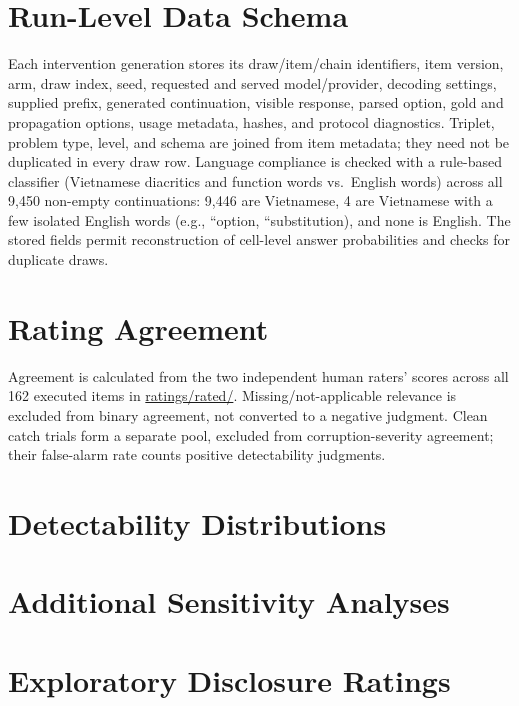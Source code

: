 \section{Run-Level Data Schema}
\label{app:schema}

Each intervention generation stores its draw/item/chain identifiers, item version, arm, draw index, seed, requested and served model/provider, decoding settings, supplied prefix, generated continuation, visible response, parsed option, gold and propagation options, usage metadata, hashes, and protocol diagnostics. Triplet, problem type, level, and schema are joined from item metadata; they need not be duplicated in every draw row. Language compliance is checked with a rule-based classifier (Vietnamese diacritics and function words vs.\ English words) across all 9,450 non-empty continuations: 9,446 are Vietnamese, 4 are Vietnamese with a few isolated English words (e.g., ``option, ``substitution), and none is English. The stored fields permit reconstruction of cell-level answer probabilities and checks for duplicate draws.

\section{Rating Agreement}
\label{app:consolidation}

Agreement is calculated from the two independent human raters' scores across all 162 executed items in \url{ratings/rated/}. Missing/not-applicable relevance is excluded from binary agreement, not converted to a negative judgment. Clean catch trials form a separate pool, excluded from corruption-severity agreement; their false-alarm rate counts positive detectability judgments.



\section{Detectability Distributions}
\label{app:severity}



\section{Additional Sensitivity Analyses}
\label{app:sensitivity}



\section{Exploratory Disclosure Ratings}
\label{app:disclosure}

